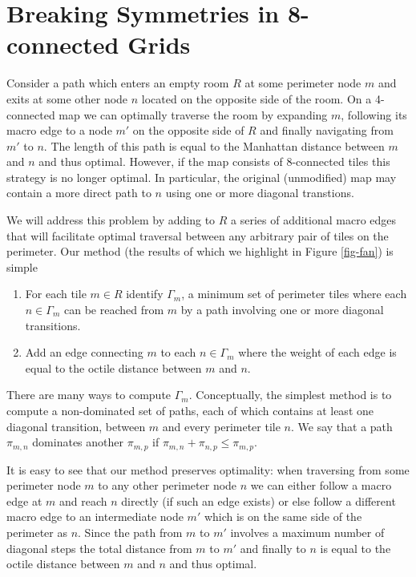\section{Breaking Symmetries in 8-connected Grids}
Consider a path which enters an empty room $R$ at some perimeter node $m$ and exits at some other
node $n$ located on the opposite side of the room.
On a 4-connected map we can optimally traverse the room by expanding $m$, following
its macro edge to a node $m'$ on the opposite side of $R$ and finally navigating from $m'$ to $n$.
The length of this path is equal to the Manhattan distance between $m$ and $n$ and thus optimal.
However, if the map consists of 8-connected tiles this strategy is no longer optimal.
In particular, the original (unmodified) map may contain a more direct path to $n$ using one or more diagonal
transtions.
\par
We will address this problem by adding to $R$ a series of additional macro edges that will facilitate optimal
traversal between any arbitrary pair of tiles on the perimeter.
Our method (the results of which we highlight in Figure \ref{fig-fan}) is simple

\begin{enumerate}
\item{For each tile $m \in R$ identify $\Gamma_{m}$, a minimum set of perimeter tiles where 
each $n \in \Gamma_{m}$ can be reached from $m$ by a path involving one or more diagonal transitions.}
\item{Add an edge connecting $m$ to each $n \in \Gamma_{m}$ where the weight of each edge is equal to the 
octile distance between $m$ and $n$.}
\end{enumerate}
There are many ways to compute $\Gamma_{m}$.
Conceptually, the simplest method is to compute a non-dominated
set of paths, each of which contains at least one diagonal transition, between $m$ and every perimeter tile $n$.
We say that a path $\pi_{m, n}$ dominates another $\pi_{m, p}$ if $\pi_{m, n} + \pi_{n, p} \leq \pi_{m, p}$.
\par
It is easy to see that our method preserves optimality: when traversing from some perimeter node $m$ to any other
perimeter node $n$ we can either follow a macro edge at $m$ and reach $n$ directly (if such an edge exists) 
or else follow a different macro edge to an intermediate node $m'$ which is on the same side of the perimeter as $n$.
Since the path from $m$ to $m'$ involves a maximum number of diagonal steps the total distance from $m$ to $m'$ and
finally to $n$ is equal to the octile distance between $m$ and $n$ and thus optimal. 


